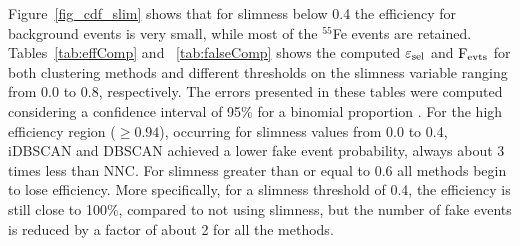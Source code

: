 \documentclass[a4paper,11pt]{article}
\begin{document}
Figure~\ref{fig_cdf_slim} shows that for slimness below 0.4 the efficiency for background events is very small, while most of the $^{55}$Fe events are retained.
Tables~\ref{tab:effComp} and ~\ref{tab:falseComp} shows the computed $\rm \varepsilon_{sel}$ and $\rm F_{evts}$ for both clustering methods and different thresholds on the slimness variable ranging from 0.0 to 0.8, respectively. The errors presented in these tables were computed considering a confidence interval of 95\% for a binomial proportion \cite{brown2001interval}. For the high efficiency region ($\geq 0.94$), occurring for slimness values from 0.0 to 0.4, iDBSCAN and DBSCAN achieved a lower fake event probability, always about 3 times less than NNC. For slimness greater than or equal to 0.6 all methods begin to lose efficiency.
More specifically, for a slimness threshold of 0.4, the efficiency is still close to 100\%, compared to not using slimness, but the number of fake events is reduced by a factor of about 2 for all the methods.
\end{document}
